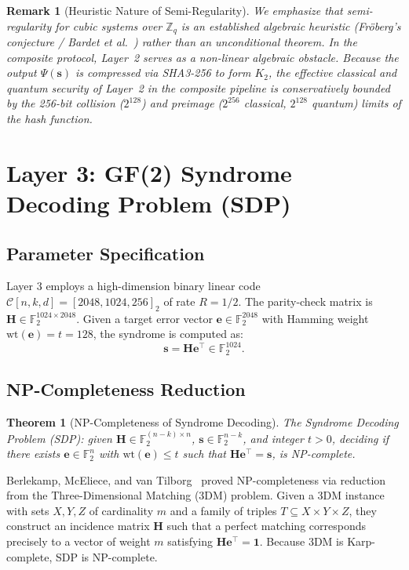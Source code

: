 \documentclass{ieeeaccess}
\newcommand{\Z}{\mathbb{Z}}
\newcommand{\F}{\mathbb{F}}
\newcommand{\calC}{\mathcal{C}}
\newcommand{\bfs}{\mathbf{s}}
\newcommand{\bfe}{\mathbf{e}}
\newcommand{\bfH}{\mathbf{H}}
\newtheorem{theorem}{Theorem}
\newtheorem{remark}{Remark}
\newenvironment{proof}{\begin{IEEEproof}\IEEEQEDoff}{\end{IEEEproof}}
\begin{document}
\begin{remark}[Heuristic Nature of Semi-Regularity]
We emphasize that semi-regularity for cubic systems over $\Z_q$ is an established algebraic heuristic (Fröberg's conjecture / Bardet et al.~\cite{Bardet2004}) rather than an unconditional theorem. In the composite protocol, Layer~2 serves as a non-linear algebraic obstacle. Because the output $\Psi(\bfs)$ is compressed via SHA3-256 to form $K_2$, the effective classical and quantum security of Layer~2 in the composite pipeline is conservatively bounded by the 256-bit collision ($2^{128}$) and preimage ($2^{256}$ classical, $2^{128}$ quantum) limits of the hash function.
\end{remark}

\section{Layer 3: GF(2) Syndrome Decoding Problem (SDP)}
\label{sec:L3}

\subsection{Parameter Specification}
Layer 3 employs a high-dimension binary linear code $\calC[n, k, d] = [2048, 1024, 256]_2$ of rate $R = 1/2$. The parity-check matrix is $\bfH \in \F_2^{1024 \times 2048}$.
Given a target error vector $\bfe \in \F_2^{2048}$ with Hamming weight $\mathrm{wt}(\bfe) = t = 128$, the syndrome is computed as:
\begin{equation}
  \bfs = \bfH \bfe^\top \in \F_2^{1024}.
  \label{eq:syndrome}
\end{equation}

\subsection{NP-Completeness Reduction}
\begin{theorem}[NP-Completeness of Syndrome Decoding]
\label{thm:L3-np}
The Syndrome Decoding Problem (SDP): given $\bfH \in \F_2^{(n-k)\times n}$, $\bfs \in \F_2^{n-k}$, and integer $t > 0$, deciding if there exists $\bfe \in \F_2^n$ with $\mathrm{wt}(\bfe) \leq t$ such that $\bfH \bfe^\top = \bfs$, is NP-complete.
\end{theorem}
\begin{proof}
Berlekamp, McEliece, and van Tilborg~\cite{Berlekamp1978} proved NP-completeness via reduction from the Three-Dimensional Matching (3DM) problem. Given a 3DM instance with sets $X, Y, Z$ of cardinality $m$ and a family of triples $T \subseteq X \times Y \times Z$, they construct an incidence matrix $\bfH$ such that a perfect matching corresponds precisely to a vector of weight $m$ satisfying $\bfH \bfe^\top = \mathbf{1}$. Because 3DM is Karp-complete, SDP is NP-complete.
\end{proof}
\end{document}
